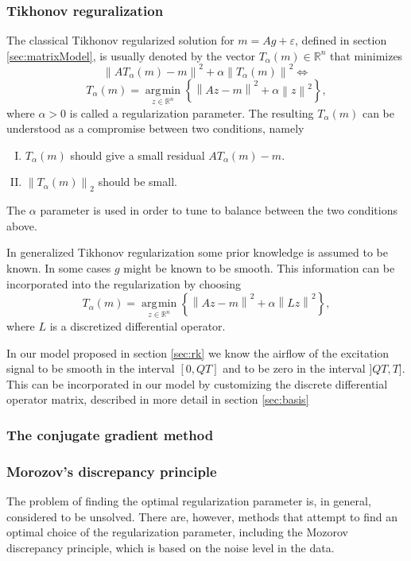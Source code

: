 \documentclass[12pt,a4]{article}
\DeclareMathOperator*{\argmin}{\arg\!\min}
\newcommand{\R}{{\mathbb R}}
\newcommand{\lnorm}{\left\|}
\newcommand{\rnorm}{\right\|}
\begin{document}
\subsubsection{Tikhonov reguralization}\label{sec:tikh}
The classical Tikhonov regularized solution for $m = Ag + \varepsilon$, defined in section \ref{sec:matrixModel}, is usually denoted by the vector $T_\alpha(m)\in\R^n$ that minimizes
\begin{equation*}
\lnorm AT_\alpha(m) - m \rnorm^2 + \alpha \lnorm T_\alpha(m) \rnorm^2 \Leftrightarrow
\end{equation*}
\begin{equation*}
T_\alpha(m) = \underset{z\in\R^n}{\argmin}
\left\{ \lnorm Az - m \rnorm^2 + \alpha \lnorm z \rnorm^2 \right\},
\end{equation*}
where $\alpha > 0$ is called a regularization parameter. The resulting $T_\alpha(m)$ can be understood as a compromise between two conditions, namely
\begin{enumerate}[I.]
 \item $T_\alpha(m)$ should give a small residual $AT_\alpha(m) - m$.
 \item $\lnorm T_\alpha(m) \rnorm_2$ should be small.
\end{enumerate}
The $\alpha$ parameter is used in order to tune to balance between the two conditions above.

In generalized Tikhonov regularization some prior knowledge is assumed to be known. In some cases $g$ might be known to be smooth. This information can be incorporated into the regularization by choosing
\begin{equation}
T_\alpha(m) = \underset{z\in\R^n}{\argmin}
\left\{ \lnorm Az - m \rnorm^2 + \alpha \lnorm Lz \rnorm^2 \right\},
\end{equation}  
where $L$ is a discretized differential operator.
 
In our model proposed in section \ref{sec:rk} we know the airflow of the excitation signal to be smooth in the interval $[0, QT]$ and to be zero in the interval $]QT, T]$. This can be incorporated in our model by customizing the discrete differential operator matrix, described in more detail in section \ref{sec:basis}


\subsubsection{The conjugate gradient method}\label{sec:conjgrad}


\subsubsection{Morozov's discrepancy principle}
The problem of finding the optimal regularization parameter is, in general, considered to be unsolved. There are, however, methods that attempt to find an optimal choice of the regularization parameter, including the Mozorov discrepancy principle, which is based on the noise level in the data.
\end{document}
